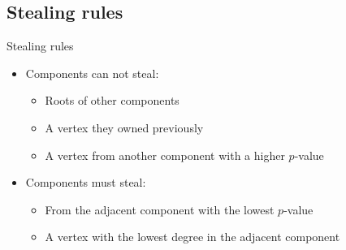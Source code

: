 \subsection{Stealing rules}

\begin{frame}{Stealing rules}
  \begin{itemize}
  \item Components can not steal:
    \begin{itemize}
    \item Roots of other components
    \item A vertex they owned previously
    \item A vertex from another component with a higher $p$-value
    \end{itemize}
  \item Components must steal:
    \begin{itemize}
    \item From the adjacent component with the lowest $p$-value
    \item A vertex with the lowest degree in the adjacent component
    \end{itemize}
  \end{itemize}
\end{frame}
